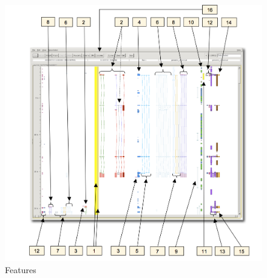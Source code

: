 \documentclass[letterpaper]{article}
\begin{document}
\begin{figure}
\centering
\color[rgb]{0.30980393,0.5058824,0.7411765}
\includegraphics[width=15.231cm]{img_features.png}
\caption{Features}
\label{img_features}
\end{figure}
\end{document}
